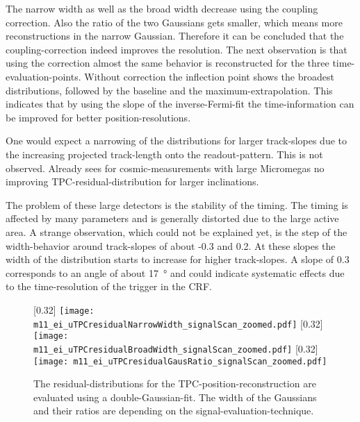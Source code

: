 \documentclass[
twoside,            %
BCOR1.4cm,          %
10pt,               %
headings=normal,    %
headsepline,        %
clearplainpage,		%
final,              %
div=14,
open=right,
bibliography=toc
]{scrreprt}
\begin{document}
The narrow width as well as the broad width decrease using the coupling correction.
Also the ratio of the two Gaussians gets smaller, which means more reconstructions in the narrow Gaussian.
Therefore it can be concluded that the coupling-correction indeed improves the resolution.
The next observation is that using the correction almost the same behavior is reconstructed for the three time-evaluation-points.
Without correction the inflection point shows the broadest distributions, followed by the baseline and the maximum-extrapolation.
This indicates that by using the slope of the inverse-Fermi-fit the time-information can be improved for better position-resolutions.

One would expect a narrowing of the distributions for larger track-slopes due to the increasing projected track-length onto the readout-pattern.
This is not observed.
Already \cite{loeselThesis} sees for cosmic-measurements with large Micromegas no improving \textmu TPC-residual-distribution for larger inclinations.

The problem of these large detectors is the stability of the timing.
The timing is affected by many parameters and is generally distorted due to the large active area.
A strange observation, which could not be explained yet, is the step of the width-behavior around track-slopes of about -0.3 and 0.2.
At these slopes the width of the distribution starts to increase for higher track-slopes.
A slope of 0.3 corresponds to an angle of about \SI{17}{\degree} and could indicate systematic effects due to the time-resolution of the trigger in the CRF.

\begin{figure}[!h]
	\centering
	[0.32\textwidth]
	{\texttt{[image: m11\_ei\_uTPCresidualNarrowWidth\_signalScan\_zoomed.pdf]}}
	\hfill
	[0.32\textwidth]
	{\texttt{[image: m11\_ei\_uTPCresidualBroadWidth\_signalScan\_zoomed.pdf]}}
	\hfill
	[0.32\textwidth]
	{\texttt{[image: m11\_ei\_uTPCresidualGausRatio\_signalScan\_zoomed.pdf]}}
	\vspace{-2mm}
	\caption{
		The residual-distributions for the \textmu TPC-position-reconstruction are evaluated using a double-Gaussian-fit.
		The width of the Gaussians and their ratios are depending on the signal-evaluation-technique.
	}
	\label{uTPCresidualDistributions}
\end{figure}
\end{document}
